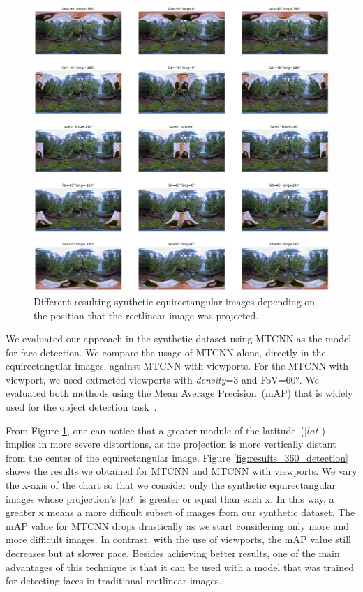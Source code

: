 \begin{figure}[!ht]
    \centering
    \includegraphics[width=0.9\linewidth]{img/video360/different_projections.png}
    \caption{Different resulting synthetic equirectangular images depending on the position that the rectlinear image was projected.}
    \label{fig:different_projections}
\end{figure}

We evaluated our approach in the synthetic dataset using MTCNN\cite{mtcnn} as the model for face detection. We compare the usage of MTCNN alone, directly in the equirectangular images, against MTCNN with viewports. For the MTCNN with viewport, we used extracted viewports with \emph{density}=3 and FoV=60°. We evaluated both methods using the Mean Average Precision~(mAP) that is widely used for the object detection task~\cite{map1, map2, map3, map4}. 


From Figure \ref{fig:different_projections}, one can notice that a greater module of the latitude~($|lat|$) implies in more severe distortions, as the projection is more vertically distant from the center of the equirectangular image. Figure \ref{fig:results_360_detection} shows the results we obtained for MTCNN and MTCNN with viewports. 
We vary the x-axis of the chart so that we consider only the synthetic equirectangular images whose projection's $|lat|$ is greater or equal than each x. In this way, a greater x means a more difficult subset of images from our synthetic dataset. The mAP value for MTCNN drops drastically as we start considering only more and more difficult images. In contrast, with the use of viewports, the mAP value still decreases but at slower pace. Besides achieving better results, one of the main advantages of this technique is that it can be used with a model that was trained for detecting faces in traditional rectlinear images.

